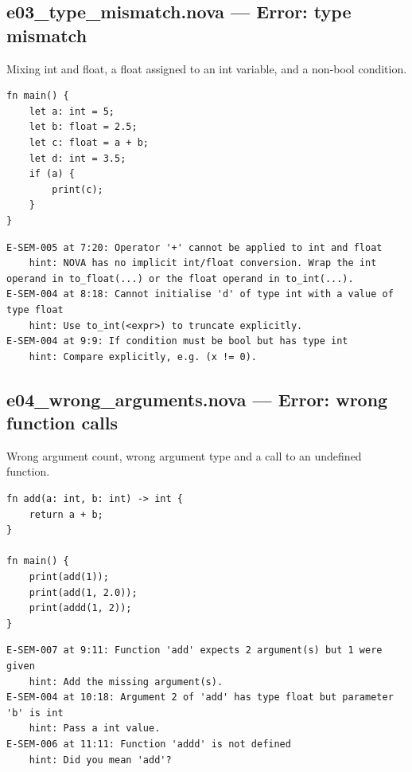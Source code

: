 \subsection*{e03\_type\_mismatch.nova --- Error: type mismatch}
\noindent Mixing int and float, a float assigned to an int variable, and a non-bool condition.
\begin{lstlisting}[language=nova,]
fn main() {
    let a: int = 5;
    let b: float = 2.5;
    let c: float = a + b;
    let d: int = 3.5;
    if (a) {
        print(c);
    }
}
\end{lstlisting}
\begin{tcolorbox}[colback=red!4,colframe=red!60!black,title={Compiler output},fonttitle=\bfseries\small,boxsep=2pt,left=4pt,right=4pt,top=2pt,bottom=2pt]
\begin{lstlisting}[basicstyle=\ttfamily\scriptsize,frame=none,backgroundcolor=\color{white}]
E-SEM-005 at 7:20: Operator '+' cannot be applied to int and float
    hint: NOVA has no implicit int/float conversion. Wrap the int operand in to_float(...) or the float operand in to_int(...).
E-SEM-004 at 8:18: Cannot initialise 'd' of type int with a value of type float
    hint: Use to_int(<expr>) to truncate explicitly.
E-SEM-004 at 9:9: If condition must be bool but has type int
    hint: Compare explicitly, e.g. (x != 0).
\end{lstlisting}
\end{tcolorbox}
\subsection*{e04\_wrong\_arguments.nova --- Error: wrong function calls}
\noindent Wrong argument count, wrong argument type and a call to an undefined function.
\begin{lstlisting}[language=nova,]
fn add(a: int, b: int) -> int {
    return a + b;
}

fn main() {
    print(add(1));
    print(add(1, 2.0));
    print(addd(1, 2));
}
\end{lstlisting}
\begin{tcolorbox}[colback=red!4,colframe=red!60!black,title={Compiler output},fonttitle=\bfseries\small,boxsep=2pt,left=4pt,right=4pt,top=2pt,bottom=2pt]
\begin{lstlisting}[basicstyle=\ttfamily\scriptsize,frame=none,backgroundcolor=\color{white}]
E-SEM-007 at 9:11: Function 'add' expects 2 argument(s) but 1 were given
    hint: Add the missing argument(s).
E-SEM-004 at 10:18: Argument 2 of 'add' has type float but parameter 'b' is int
    hint: Pass a int value.
E-SEM-006 at 11:11: Function 'addd' is not defined
    hint: Did you mean 'add'?
\end{lstlisting}
\end{tcolorbox}
